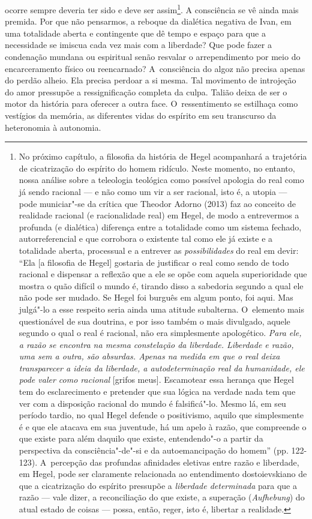 ocorre sempre deveria ter sido e deve ser assim\footnote{No próximo
  capítulo, a filosofia da história de Hegel acompanhará a trajetória de
  cicatrização do espírito do homem ridículo. Neste momento, no entanto,
  nossa análise sobre a teleologia teológica como possível apologia do
  real como já sendo racional --- e não como um vir a ser racional, isto
  é, a utopia --- pode municiar"-se da crítica que Theodor Adorno (2013)
  faz ao conceito de realidade racional (e racionalidade real) em Hegel,
  de modo a entrevermos a profunda (e dialética) diferença entre a
  totalidade como um sistema fechado, autorreferencial e que corrobora o
  existente tal como ele já existe e a totalidade aberta, processual e a
  entrever as \emph{possibilidades} do real em devir: ``Ela {[}a
  filosofia de Hegel{]} gostaria de justificar o real como sendo de todo
  racional e dispensar a reflexão que a ele se opõe com aquela
  superioridade que mostra o quão difícil o mundo é, tirando disso a
  sabedoria segundo a qual ele não pode ser mudado. Se Hegel foi burguês
  em algum ponto, foi aqui. Mas julgá"-lo a esse respeito seria ainda uma
  atitude subalterna. O~elemento mais questionável de sua doutrina, e
  por isso também o mais divulgado, aquele segundo o qual o real é
  racional, não era simplesmente apologético. \emph{Para ele, a razão se
  encontra na mesma constelação da liberdade. Liberdade e razão, uma sem
  a outra, são absurdas. Apenas na medida em que o real deixa
  transparecer a ideia da liberdade, a autodeterminação real da
  humanidade, ele pode valer como racional} {[}grifos meus{]}.
  Escamotear essa herança que Hegel tem do esclarecimento e pretender
  que sua lógica na verdade nada tem que ver com a disposição racional
  do mundo é falsificá"-lo. Mesmo lá, em seu período tardio, no qual
  Hegel defende o positivismo, aquilo que simplesmente é e que ele
  atacava em sua juventude, há um apelo à razão, que compreende o que
  existe para além daquilo que existe, entendendo"-o a partir da
  perspectiva da consciência"-de"-si e da autoemancipação do homem'' (pp.
  122-123). A~percepção das profundas afinidades eletivas entre razão e
  liberdade, em Hegel, pode ser claramente relacionada ao entendimento
  dostoievskiano de que a cicatrização do espírito pressupõe a
  \emph{liberdade determinada} para que a razão --- vale dizer, a
  reconciliação do que existe, a superação (\emph{Aufhebung}) do atual
  estado de coisas --- possa, então, reger, isto é, libertar a realidade.}.
A consciência se vê ainda mais premida. Por que não pensarmos, a reboque
da dialética negativa de Ivan, em uma totalidade aberta e contingente
que dê tempo e espaço para que a necessidade se imiscua cada vez mais
com a liberdade? Que pode fazer a condenação mundana ou espiritual senão
resvalar o arrependimento por meio do encarceramento físico ou
reencarnado? A~consciência do algoz não precisa apenas do perdão alheio.
Ela precisa perdoar a si mesma. Tal movimento de introjeção do amor
pressupõe a ressignificação completa da culpa. Talião deixa de ser o
motor da história para oferecer a outra face. O~ressentimento se
estilhaça como vestígios da memória, as diferentes vidas do espírito em
seu transcurso da heteronomia à autonomia.

